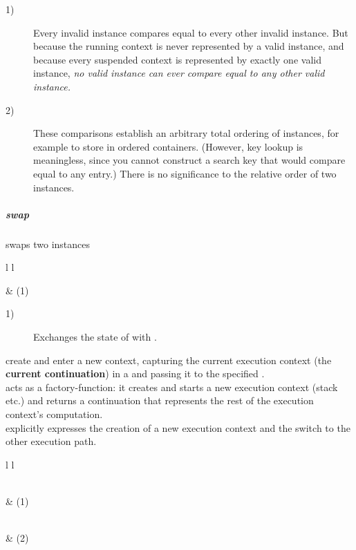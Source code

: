 \begin{description}
    \item[1)] Every invalid \cont instance compares equal to every other
              invalid instance. But because the running context is never
              represented by a valid \cont instance, and because every
              suspended context is represented by exactly one valid
              instance, \emph{no valid instance can ever compare equal to any
              other valid instance.}
    \item[2)] These comparisons establish an arbitrary total ordering of \cont
              instances, for example to store in ordered containers. (However,
              key lookup is meaningless, since you cannot construct a search
              key that would compare equal to any entry.) There is no
              significance to the relative order of two instances.
\end{description}


\subparagraph*{swap}
swaps two \cont instances\\

\begin{tabular}{ l l }
    \midrule

     & (1)\\

    \midrule
\end{tabular}

\begin{description}
    \item[1)] Exchanges the state of  with .\\
\end{description}



create and enter a new context, capturing the current execution context (the
{\bfseries current continuation}) in a \cont and passing it to the
specified \entryfn.\\
\callcc acts as a factory-function: it creates and starts a new execution context
(stack etc.) and returns a continuation that represents the rest of the execution
context's computation.\\
\callcc explicitly expresses the creation of a new execution
context and the switch to the other execution path.\\

\begin{tabular}{ l l }
    \midrule

    \\
     & (1)\\

    \midrule

    \\
     & (2)\\

    \midrule
\end{tabular}

